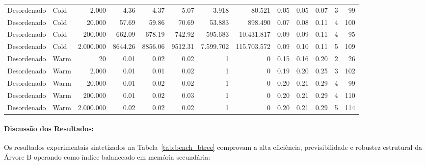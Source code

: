 \documentclass[12pt,a4paper]{article}
\begin{document}
\begin{table}[H]
{\begin{tabular}{llr rrr rr rrr rr}
Desordenado & Cold & 2.000               &    4.36 &    4.37 &    5.07 & 3.918 & 80.521 &    0.05 &    0.05 &    0.07 &     3 &    99 \\
Desordenado & Cold & 20.000            &   57.69 &   59.86 &   70.69 & 53.883 & 898.490 &    0.07 &    0.08 &    0.11 &     4 &   100 \\
Desordenado & Cold & 200.000         &  662.09 &  678.19 &  742.92 & 595.683 & 10.431.817 &    0.09 &    0.09 &    0.11 &     4 &    95 \\
Desordenado & Cold & 2.000.000   & 8644.26 & 8856.06 & 9512.31 & 7.599.702 & 115.703.572 &    0.09 &    0.10 &    0.11 &     5 &   109 \\
\midrule
Desordenado & Warm & 20                        &    0.01 &    0.02 &    0.02 &     1 &     0 &    0.15 &    0.16 &    0.20 &     2 &    26 \\
Desordenado & Warm & 2.000               &    0.01 &    0.01 &    0.02 &     1 &     0 &    0.19 &    0.20 &    0.25 &     3 &   102 \\
Desordenado & Warm & 20.000            &    0.01 &    0.02 &    0.02 &     1 &     0 &    0.20 &    0.21 &    0.29 &     4 &    99 \\
Desordenado & Warm & 200.000         &    0.01 &    0.02 &    0.03 &     1 &     0 &    0.20 &    0.21 &    0.29 &     4 &   110 \\
Desordenado & Warm & 2.000.000   &    0.02 &    0.02 &    0.02 &     1 &     0 &    0.20 &    0.21 &    0.29 &     5 &   114 \\
\bottomrule
\end{tabular}%
}
\end{table}

\paragraph{Discussão dos Resultados:}
Os resultados experimentais sintetizados na Tabela~\ref{tab:bench_btree} comprovam a alta eficiência, previsibilidade e robustez estrutural da Árvore B operando como índice balanceado em memória secundária:
\end{document}
